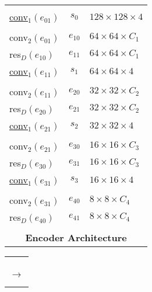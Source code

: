 \begin{center}
\begin{minipage}{0.4\textwidth}
\begin{tabular}{l|c|l}
			&&                                                       \\
			\underline{conv}$_1(e_{01})$ & $s_0$ & $128 \times 128 \times 4$ \\
			&&                                                   \\
			\hline
			conv$_2(e_{01})$ & $e_{10}$ & $64 \times 64 \times C_1$\\
			res$_D(e_{10})$ & $e_{11}$ & $64 \times 64 \times C_1$ \\
			\underline{conv}$_1(e_{11})$ & $s_1$ & $64 \times 64 \times 4$ \\
			&&                                                 \\
			\hline
			conv$_2(e_{11})$ & $e_{20}$ & $32 \times 32 \times C_2$\\
			res$_D(e_{20})$ & $e_{21}$ & $32 \times 32 \times C_2$ \\
			\underline{conv}$_1(e_{21})$ & $s_2$ & $32 \times 32 \times 4$ \\
			&&                                                 \\
			\hline
			conv$_2(e_{21})$ & $e_{30}$ & $16 \times 16 \times C_3$\\
			res$_D(e_{30})$ & $e_{31}$ & $16 \times 16 \times C_3$ \\
			\underline{conv}$_1(e_{31})$ & $s_3$ & $16 \times 16 \times 4$ \\
			&&                                                 \\
			\hline
			conv$_2(e_{31})$ & $e_{40}$ & $8 \times 8 \times C_4$\\
			res$_D(e_{40})$ & $e_{41}$ & $8 \times 8 \times C_4$ \\
			\multicolumn{3}{c}{}             \\
			\multicolumn{3}{c}{\textbf{Encoder Architecture}}             \\
		\end{tabular}
	\end{minipage}
	\hfill
	\begin{minipage}{0.02\textwidth}
		\centering
		\begin{tabular}{c}
			\\		
			\\		
			\\	
			\\	
			\\
			$\longrightarrow$\\	
			\\	
			\\	

\end{tabular}
\end{minipage}
\end{center}
